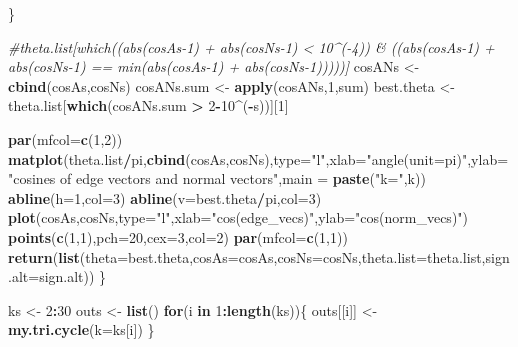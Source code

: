 \documentclass[]{article}
\newenvironment{Shaded}{\begin{snugshade}}{\end{snugshade}}
\newcommand{\KeywordTok}[1]{\textcolor[rgb]{0.13,0.29,0.53}{\textbf{#1}}}
\newcommand{\DataTypeTok}[1]{\textcolor[rgb]{0.13,0.29,0.53}{#1}}
\newcommand{\DecValTok}[1]{\textcolor[rgb]{0.00,0.00,0.81}{#1}}
\newcommand{\StringTok}[1]{\textcolor[rgb]{0.31,0.60,0.02}{#1}}
\newcommand{\CommentTok}[1]{\textcolor[rgb]{0.56,0.35,0.01}{\textit{#1}}}
\newcommand{\ControlFlowTok}[1]{\textcolor[rgb]{0.13,0.29,0.53}{\textbf{#1}}}
\newcommand{\OperatorTok}[1]{\textcolor[rgb]{0.81,0.36,0.00}{\textbf{#1}}}
\newcommand{\NormalTok}[1]{#1}
\begin{document}
\begin{Shaded}
\begin{Highlighting}[]
\NormalTok{  \}}
  
  \CommentTok{#theta.list[which((abs(cosAs-1) + abs(cosNs-1) < 10^(-4)) & ((abs(cosAs-1) + abs(cosNs-1) == min(abs(cosAs-1) + abs(cosNs-1)))))]}
\NormalTok{  cosANs <-}\StringTok{ }\KeywordTok{cbind}\NormalTok{(cosAs,cosNs)}
\NormalTok{  cosANs.sum <-}\StringTok{ }\KeywordTok{apply}\NormalTok{(cosANs,}\DecValTok{1}\NormalTok{,sum)}
\NormalTok{  best.theta <-}\StringTok{ }\NormalTok{theta.list[}\KeywordTok{which}\NormalTok{(cosANs.sum }\OperatorTok{>}\StringTok{ }\DecValTok{2}\OperatorTok{-}\DecValTok{10}\OperatorTok{^}\NormalTok{(}\OperatorTok{-}\NormalTok{s))][}\DecValTok{1}\NormalTok{]}
  
  
  \KeywordTok{par}\NormalTok{(}\DataTypeTok{mfcol=}\KeywordTok{c}\NormalTok{(}\DecValTok{1}\NormalTok{,}\DecValTok{2}\NormalTok{)) }
  \KeywordTok{matplot}\NormalTok{(theta.list}\OperatorTok{/}\NormalTok{pi,}\KeywordTok{cbind}\NormalTok{(cosAs,cosNs),}\DataTypeTok{type=}\StringTok{"l"}\NormalTok{,}\DataTypeTok{xlab=}\StringTok{"angle(unit=pi)"}\NormalTok{,}\DataTypeTok{ylab=}\StringTok{"cosines of edge vectors and normal vectors"}\NormalTok{,}\DataTypeTok{main =} \KeywordTok{paste}\NormalTok{(}\StringTok{"k="}\NormalTok{,k))}
  \KeywordTok{abline}\NormalTok{(}\DataTypeTok{h=}\DecValTok{1}\NormalTok{,}\DataTypeTok{col=}\DecValTok{3}\NormalTok{)}
  \KeywordTok{abline}\NormalTok{(}\DataTypeTok{v=}\NormalTok{best.theta}\OperatorTok{/}\NormalTok{pi,}\DataTypeTok{col=}\DecValTok{3}\NormalTok{)}
  \KeywordTok{plot}\NormalTok{(cosAs,cosNs,}\DataTypeTok{type=}\StringTok{"l"}\NormalTok{,}\DataTypeTok{xlab=}\StringTok{"cos(edge_vecs)"}\NormalTok{,}\DataTypeTok{ylab=}\StringTok{"cos(norm_vecs)"}\NormalTok{)}
  \KeywordTok{points}\NormalTok{(}\KeywordTok{c}\NormalTok{(}\DecValTok{1}\NormalTok{,}\DecValTok{1}\NormalTok{),}\DataTypeTok{pch=}\DecValTok{20}\NormalTok{,}\DataTypeTok{cex=}\DecValTok{3}\NormalTok{,}\DataTypeTok{col=}\DecValTok{2}\NormalTok{)}
  \KeywordTok{par}\NormalTok{(}\DataTypeTok{mfcol=}\KeywordTok{c}\NormalTok{(}\DecValTok{1}\NormalTok{,}\DecValTok{1}\NormalTok{))  }
  \KeywordTok{return}\NormalTok{(}\KeywordTok{list}\NormalTok{(}\DataTypeTok{theta=}\NormalTok{best.theta,}\DataTypeTok{cosAs=}\NormalTok{cosAs,}\DataTypeTok{cosNs=}\NormalTok{cosNs,}\DataTypeTok{theta.list=}\NormalTok{theta.list,}\DataTypeTok{sign.alt=}\NormalTok{sign.alt))}
\NormalTok{\}}
\end{Highlighting}
\end{Shaded}

\begin{Shaded}
\begin{Highlighting}[]
\NormalTok{ks <-}\StringTok{ }\DecValTok{2}\OperatorTok{:}\DecValTok{30}
\NormalTok{outs <-}\StringTok{ }\KeywordTok{list}\NormalTok{()}
\ControlFlowTok{for}\NormalTok{(i }\ControlFlowTok{in} \DecValTok{1}\OperatorTok{:}\KeywordTok{length}\NormalTok{(ks))\{}
\NormalTok{  outs[[i]] <-}\StringTok{ }\KeywordTok{my.tri.cycle}\NormalTok{(}\DataTypeTok{k=}\NormalTok{ks[i])}
\NormalTok{\}}
\end{Highlighting}
\end{Shaded}
\end{document}
